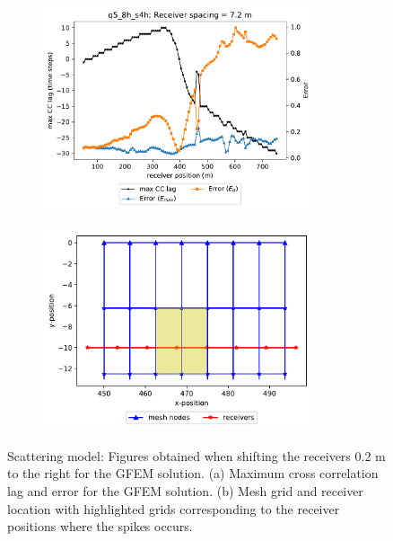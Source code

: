 \begin{figure}[h!]
 		\centering
		\begin{subfigure}{8cm}
				\includegraphics[width=8cm, height=6cm]{Thesis_Edith/figures/scattering/appendix/spike7_2.pdf}
			     \caption{}
		\end{subfigure}
        \hspace{0.25cm}
		\begin{subfigure}{8cm}
				\includegraphics[width=8cm, height=6cm]{Thesis_Edith/figures/scattering/appendix/receiver-spacing4_v2.pdf}
			   \caption{}
		\end{subfigure}
 
	\caption{Scattering model: Figures obtained when shifting the receivers 0.2 m to the right for the GFEM solution. (a) Maximum cross correlation lag and error for the GFEM solution. (b) Mesh grid and receiver location with highlighted grids corresponding to the receiver positions where the spikes occurs. }  
	\label{fig:a.4}
\end{figure}


